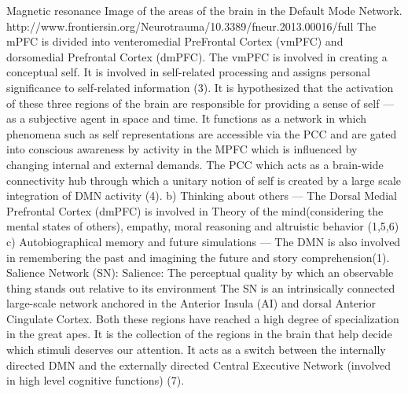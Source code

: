 \documentclass{article}
\begin{document}
Magnetic resonance Image of the areas of the brain in the Default Mode Network. http://www.frontiersin.org/Neurotrauma/10.3389/fneur.2013.00016/full
The mPFC is divided into venteromedial PreFrontal Cortex (vmPFC) and dorsomedial Prefrontal Cortex (dmPFC). The vmPFC is involved in creating a conceptual self. It is involved in self-related processing and assigns personal significance to self-related information (3).
It is hypothesized that the activation of these three regions of the brain are responsible for providing a sense of self — as a subjective agent in space and time. It functions as a network in which phenomena such as self representations are accessible via the PCC and are gated into conscious awareness by activity in the MPFC which is influenced by changing internal and external demands. The PCC which acts as a brain-wide connectivity hub through which a unitary notion of self is created by a large scale integration of DMN activity (4).
b) Thinking about others —
The Dorsal Medial Prefrontal Cortex (dmPFC) is involved in Theory of the mind(considering the mental states of others), empathy, moral reasoning and altruistic behavior (1,5,6)
c) Autobiographical memory and future simulations —
The DMN is also involved in remembering the past and imagining the future and story comprehension(1).
Salience Network (SN):
Salience: The perceptual quality by which an observable thing stands out relative to its environment
The SN is an intrinsically connected large-scale network anchored in the Anterior Insula (AI) and dorsal Anterior Cingulate Cortex. Both these regions have reached a high degree of specialization in the great apes. It is the collection of the regions in the brain that help decide which stimuli deserves our attention. It acts as a switch between the internally directed DMN and the externally directed Central Executive Network (involved in high level cognitive functions) (7).
\end{document}
